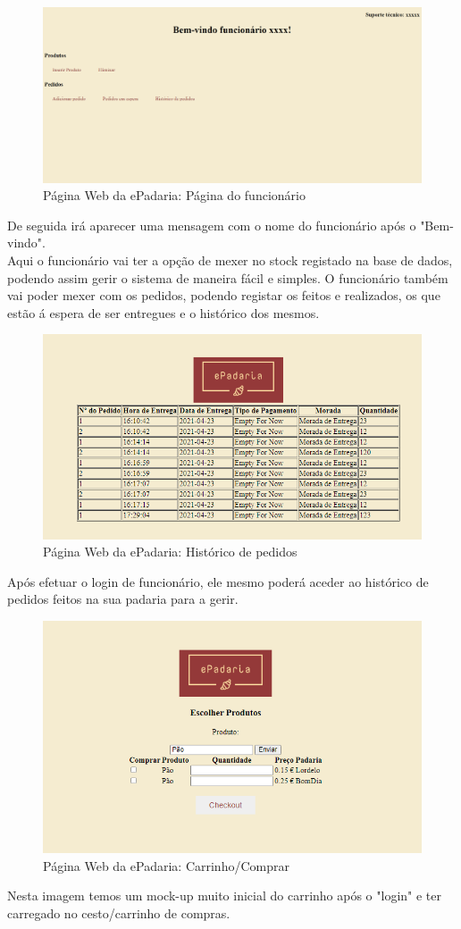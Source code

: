 \begin{figure}[H]
	\centering
	\includegraphics[width=15cm]{"mockup page func"}
	\caption{Página Web da ePadaria: Página do funcionário}
	\label{fig:mockup-page-func}
\end{figure}

De seguida irá aparecer uma mensagem com o nome do funcionário após o "Bem-vindo".\\
Aqui o funcionário vai ter a opção de mexer no stock registado na base de dados, podendo assim gerir o sistema de maneira fácil e simples.
O funcionário também vai poder mexer com os pedidos, podendo registar os feitos e realizados, os que estão á espera de ser entregues e o histórico dos mesmos.\\

\begin{figure}[H]
	\centering
	\includegraphics[width=15cm]{produtos33}
	\caption{Página Web da ePadaria: Histórico de pedidos }
	\label{fig:produtos33}
\end{figure}
Após efetuar o login de funcionário, ele mesmo poderá aceder ao histórico de pedidos feitos na sua padaria para a gerir.

\begin{figure}[H]
	\centering
	\includegraphics[width=15cm]{produtos2}
	\caption{Página Web da ePadaria: Carrinho/Comprar}
	\label{fig:produtos2}
\end{figure}
Nesta imagem temos um mock-up muito inicial do carrinho após o "login" e ter carregado no cesto/carrinho de compras.